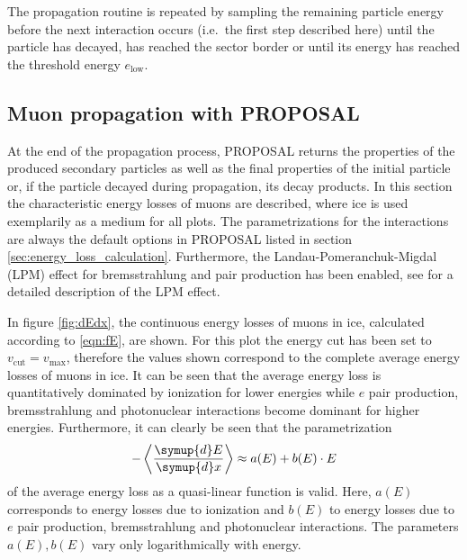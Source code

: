 The propagation routine is repeated by sampling the remaining particle energy before the next interaction occurs (i.e.\ the first step described here) until the particle has decayed, has reached the sector border or until its energy has reached the threshold energy $e_\text{low}$.

\subsection{Muon propagation with PROPOSAL}



At the end of the propagation process, PROPOSAL returns the properties of the produced secondary particles as well as the final properties of the initial particle or, if the particle decayed during propagation, its decay products.
In this section the characteristic energy losses of muons are described, where ice is used exemplarily as a medium for all plots. 
The parametrizations for the interactions are always the default options in PROPOSAL listed in section \ref{sec:energy_loss_calculation}.
Furthermore, the Landau-Pomeranchuk-Migdal (LPM) effect for bremsstrahlung and pair production has been enabled, see \cite{Kohne:2013zbq} for a detailed description of the LPM effect.

In figure \ref{fig:dEdx}, the continuous energy losses of muons in ice, calculated according to \eqref{eqn:fE}, are shown.
For this plot the energy cut has been set to $v_\text{cut} = v_\text{max}$, therefore the values shown correspond to the complete average energy losses of muons in ice. 
It can be seen that the average energy loss is quantitatively dominated by ionization for lower energies while $e$ pair production, bremsstrahlung and photonuclear interactions become dominant for higher energies.
Furthermore, it can clearly be seen that the parametrization
%
\begin{equation}
	- \left\langle \frac{\symup{d}E}{\symup{d}x} \right\rangle \approx a(E) + b(E) \cdot E
\end{equation}
%
of the average energy loss as a quasi-linear function is valid.
Here, $a(E)$ corresponds to energy losses due to ionization and $b(E)$ to energy losses due to $e$ pair production, bremsstrahlung and photonuclear interactions.
The parameters $a(E), b(E)$ vary only logarithmically with energy.

